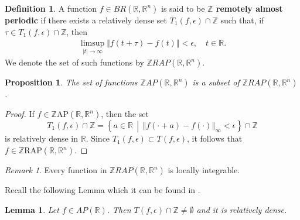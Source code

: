 \documentclass[english,,reqno]{amsart}
\numberwithin{equation}{section}
\newcommand{\bb}[1]{\mathbb{#1}}
\theoremstyle{plain}
\newtheorem{lem}[thm]{Lemma}
\newtheorem{prop}[thm]{Proposition}
\theoremstyle{definition}
\newtheorem{defn}{Definition}[section]
\theoremstyle{remark}
\newtheorem*{rem}{Remark}
\begin{document}
\begin{defn}\label{def_ZRAP}
A function $f \in BR(\mathbb{R}, \mathbb{R}^n)$ is said to be \textbf{$\mathbb{Z}$ remotely almost periodic} if there exists a relatively dense set $T_1(f, \epsilon) \cap \mathbb{Z}$ such that,  
if $\tau \in T_1(f, \epsilon) \cap \mathbb{Z}$, then  
\begin{eqnarray*}
\limsup_{\vert t \vert \rightarrow \infty} \Vert f(t+\tau)-f(t) \Vert < \epsilon,\quad t \in \mathbb{R}.
\end{eqnarray*}  
We denote the set of such functions by $\mathbb{Z}RAP(\mathbb{R}, \mathbb{R}^n)$.
\end{defn}


\begin{prop}
The set of functions $\mathbb{Z}AP(\mathbb{R},\mathbb{R}^n)$ is a subset of $\mathbb{Z}RAP(\mathbb{R},\mathbb{R}^n)$.
\end{prop}
\begin{proof}
If $f \in \mathbb{Z}\mathrm{AP}\left(\mathbb{R},\mathbb{R}^{n}\right)$, then the set  
\[
T_{1}\left(f,\epsilon\right)\cap \mathbb{Z} = \left\{ a\in\mathbb{R} \,\middle|\, \left\Vert f\left(\cdot+a\right)-f\left(\cdot\right)\right\Vert_{\infty} <\epsilon \right\} \cap \mathbb{Z}
\]  
is relatively dense in $\mathbb{R}$.  
Since $T_{1}\left(f,\epsilon\right) \subset T\left(f,\epsilon\right)$, it follows that  
$f \in \mathbb{Z}\mathrm{RAP}\left(\mathbb{R},\mathbb{R}^{n}\right)$.
\end{proof}


\begin{rem}
Every function in $\bb{Z}RAP(\bb{R},\bb{R}^n)$ is locally integrable.
\end{rem}

Recall the following Lemma which it can be found in \cite{corduneanu_waves}.
\begin{lem}\label{AP_TcapZ_novacio}
Let $f \in AP(\mathbb{R})$. Then $T(f,\epsilon) \cap \mathbb{Z} \neq \emptyset$ and it is relatively dense.
\end{lem}  
\end{document}
